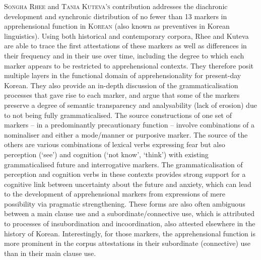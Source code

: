 \documentclass[output=paper,colorlinks,citecolor=brown
]{langscibook}
\begin{document}
\textsc{Songha} \textsc{Rhee} and \textsc{Tania} \textsc{Kuteva's} contribution addresses the diachronic development and synchronic distribution of no fewer than 13 markers in apprehensional function in \textsc{Korean} (also known as preventives in Korean linguistics). Using both historical and contemporary corpora, Rhee and Kuteva are able to trace the first attestations of these markers as well as differences in their frequency and in their use over time, including the degree to which each marker appears to be restricted to apprehensional contexts. They therefore posit multiple layers in the functional domain of apprehensionality for present-day Korean. They also provide an in-depth discussion of the grammaticalisation processes that gave rise to each marker, and argue that some of the markers preserve a degree of semantic transparency and analysability (lack of erosion) due to not being fully grammaticalised. The source constructions of one set of markers – in a predominantly precautionary function – involve combinations of a nominaliser and either a mode/manner or purposive marker. The source of the others are various combinations of lexical verbs expressing fear but also perception (`see') and cognition (`not know', `think') with existing grammaticalised future and interrogative markers. The grammaticalisation of perception and cognition verbs in these contexts provides strong support for a cognitive link between uncertainty about the future and anxiety, which can lead to the development of apprehensional markers from expressions of mere possibility via pragmatic strengthening. These forms are also often ambiguous between a main clause use and a subordinate/connective use, which is attributed to processes of insubordination and incoordination, also attested elsewhere in the history of Korean. Interestingly, for those markers, the apprehensional function is more prominent in the corpus attestations in their subordinate (connective) use than in their main clause use.
\end{document}
